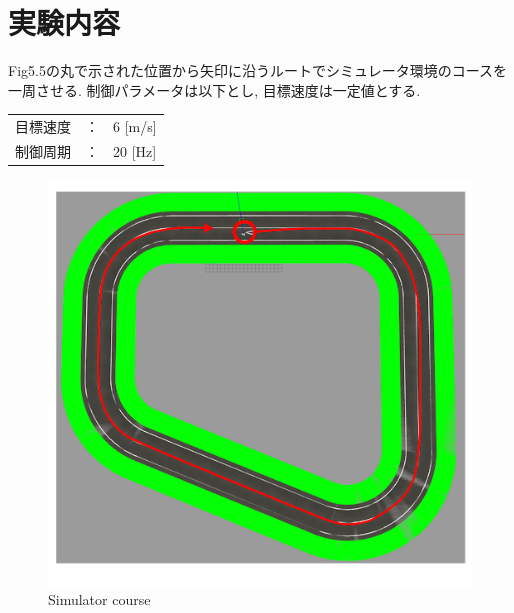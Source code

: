 \section{実験内容}
Fig5.5の丸で示された位置から矢印に沿うルートでシミュレータ環境のコースを一周させる.
制御パラメータは以下とし, 目標速度は一定値とする.

\begin{table}[H]
     \begin{tabular}{lcl}
         $目標速度$ & ： & 6 [m/s] \\
         $制御周期$ & ： & 20 [Hz] \\
     \end{tabular}
\end{table}

\begin{figure}[H]
  \centering
 \includegraphics[keepaspectratio, scale=0.55]
      {images/simulatorpath.png}
 \caption{Simulator course}
 \label{fig:simulator}
\end{figure}


